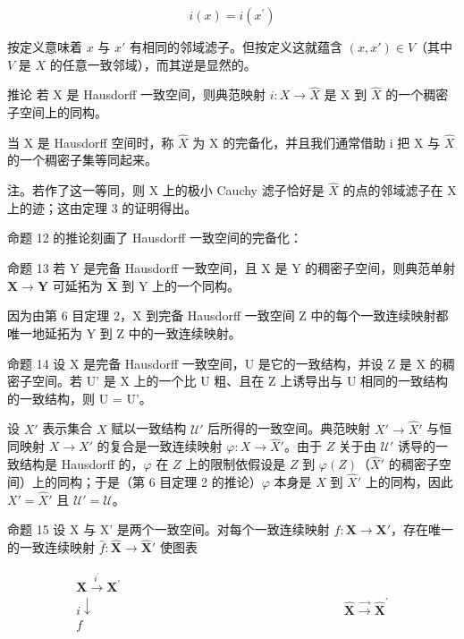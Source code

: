 \[
i (x) = i \left(x ^ {\prime}\right)
\]

按定义意味着 \(x\) 与 \(x'\) 有相同的邻域滤子。但按定义这就蕴含 \((x, x') \in V\)（其中 \(V\) 是 \(X\) 的任意一致邻域），而其逆是显然的。

推论 若 X 是 Hausdorff 一致空间，则典范映射 \(i: X \to \hat{X}\) 是 X 到 \(\hat{X}\) 的一个稠密子空间上的同构。

当 X 是 Hausdorff 空间时，称 \(\hat{X}\) 为 X 的完备化，并且我们通常借助 i 把 X 与 \(\hat{X}\) 的一个稠密子集等同起来。

注。若作了这一等同，则 X 上的极小 Cauchy 滤子恰好是 \(\hat{X}\) 的点的邻域滤子在 X 上的迹；这由定理 3 的证明得出。

命题 12 的推论刻画了 Hausdorff 一致空间的完备化：

命题 13 若 Y 是完备 Hausdorff 一致空间，且 X 是 Y 的稠密子空间，则典范单射 \(\mathbf{X} \to \mathbf{Y}\) 可延拓为 \(\hat{\mathbf{X}}\) 到 Y 上的一个同构。

因为由第 6 目定理 2，X 到完备 Hausdorff 一致空间 Z 中的每个一致连续映射都唯一地延拓为 Y 到 Z 中的一致连续映射。

命题 14 设 X 是完备 Hausdorff 一致空间，U 是它的一致结构，并设 Z 是 X 的稠密子空间。若 U' 是 X 上的一个比 U 粗、且在 Z 上诱导出与 U 相同的一致结构的一致结构，则 U = U'。

设 \(X'\) 表示集合 \(X\) 赋以一致结构 \(\mathcal{U}'\) 后所得的一致空间。典范映射 \(X' \to \hat{X}'\) 与恒同映射 \(X \to X'\) 的复合是一致连续映射 \(\varphi: X \to \hat{X}'\)。由于 \(Z\) 关于由 \(\mathcal{U}'\) 诱导的一致结构是 Hausdorff 的，\(\varphi\) 在 \(Z\) 上的限制依假设是 \(Z\) 到 \(\varphi(Z)\)（\(\hat{X}'\) 的稠密子空间）上的同构；于是（第 6 目定理 2 的推论）\(\varphi\) 本身是 \(X\) 到 \(\hat{X}'\) 上的同构，因此 \(X' = \hat{X}'\) 且 \(\mathcal{U}' = \mathcal{U}\)。

命题 15 设 X 与 X' 是两个一致空间。对每个一致连续映射 \(f: \mathbf{X} \to \mathbf{X}'\)，存在唯一的一致连续映射 \(\hat{f}: \hat{\mathbf{X}} \to \hat{\mathbf{X}}'\) 使图表

\[
\begin{array}{c}\mathbf {X} \stackrel {{i ^ {\prime}}} {{\to}} \mathbf {X} ^ {\prime}\\i \downarrow \quad \quad \quad \quad \quad \quad \quad \quad \quad \quad \quad \quad \quad \quad \quad \quad \quad \quad \quad \quad \hat {\mathbf {X}} \stackrel {{\rightarrow}} {{\longrightarrow}} \hat {\mathbf {X}} ^ {\prime}\\f\end{array}
\]

